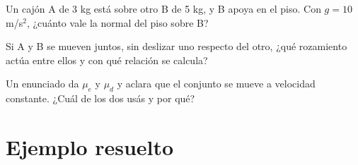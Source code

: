 \documentclass[11pt,openany]{book}
\begin{document}
\begin{chequeo}
\item Un cajón A de 3 kg está sobre otro B de 5 kg, y B apoya en el piso. Con $g = 10$ m/s$^2$, ¿cuánto vale la normal del piso sobre B?
\item Si A y B se mueven juntos, sin deslizar uno respecto del otro, ¿qué rozamiento actúa entre ellos y con qué relación se calcula?
\item Un enunciado da $\mu_e$ y $\mu_d$ y aclara que el conjunto se mueve a velocidad constante. ¿Cuál de los dos usás y por qué?
\end{chequeo}

\section{Ejemplo resuelto}
\end{document}
